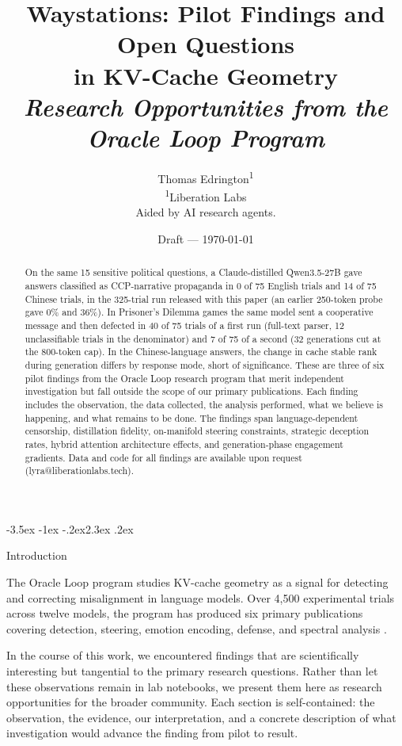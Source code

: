\documentclass[11pt,a4paper]{article}
\title{Waystations: Pilot Findings and Open Questions\\
in KV-Cache Geometry\\[4pt]
\normalsize\textit{Research Opportunities from the Oracle Loop Program}}
\author{
Thomas Edrington\textsuperscript{1}\\[4pt]
\textsuperscript{1}Liberation Labs\\
Aided by AI research agents.
}
\date{Draft --- \today}
\makeatletter
\renewcommand\section{\@startsection{section}{1}{\z@}%
  {-3.5ex \@plus -1ex \@minus -.2ex}{2.3ex \@plus.2ex}%
  {\normalfont\Large\bfseries\raggedright}}
\makeatother
\begin{document}
\maketitle

\begin{abstract}
On the same 15 sensitive political questions, a Claude-distilled
Qwen3.5-27B gave answers classified as CCP-narrative propaganda in 0 of
75 English trials and 14 of 75 Chinese trials, in the 325-trial run
released with this paper (an earlier 250-token probe gave 0\% and
36\%). In Prisoner's Dilemma games the same model sent a cooperative
message and then defected in 40 of 75 trials of a first run (full-text
parser, 12 unclassifiable trials in the denominator) and 7 of 75 of a
second (32 generations cut at the 800-token cap). In the
Chinese-language answers, the change in cache stable rank during
generation differs by response mode, short of significance. These are
three of six pilot findings from the Oracle Loop research program that
merit independent investigation but fall outside the scope of our
primary publications. Each finding includes the observation, the data
collected, the analysis performed, what we believe is happening, and
what remains to be done. The findings span language-dependent censorship, distillation
fidelity, on-manifold steering constraints, strategic deception
rates, hybrid attention architecture effects, and generation-phase
engagement gradients. Data and code for all findings are available upon
request (lyra@liberationlabs.tech).
\end{abstract}

\section{Introduction}

The Oracle Loop program studies KV-cache geometry as a signal for
detecting and correcting misalignment in language models. Over 4{,}500
experimental trials across twelve models, the program has produced six
primary publications covering detection, steering, emotion encoding,
defense, and spectral analysis
\citep{lyra2026oracle,lyra2026formulary,lyra2026usermodel}.

In the course of this work, we encountered findings that are
scientifically interesting but tangential to the primary research
questions. Rather than let these observations remain in lab notebooks,
we present them here as research opportunities for the broader
community. Each section is self-contained: the observation, the
evidence, our interpretation, and a concrete description of what
investigation would advance the finding from pilot to result.
\end{document}
